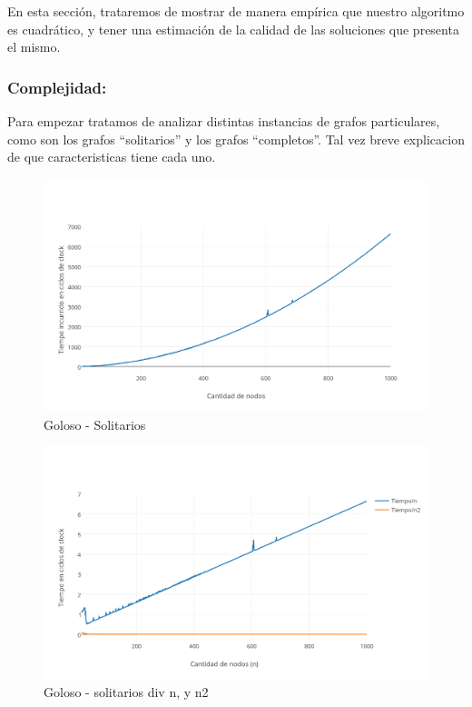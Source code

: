 En esta sección, trataremos de mostrar de manera empírica que nuestro algoritmo es cuadrático, y tener una estimación de la calidad de las soluciones que presenta el mismo.

\vspace*{0.6cm}

\subsubsection{Complejidad:}
\vspace*{0.3cm}

Para empezar tratamos de analizar distintas instancias de grafos particulares, como son los grafos ``solitarios'' y los grafos ``completos''. Tal vez breve explicacion de que caracteristicas tiene cada uno.

\begin{figure}[htb]
	\begin{center}
    		\includegraphics[scale=0.6]{imagenes/goloso-solitarios.png}
	\end{center}
	\caption{Goloso - Solitarios\label{fig:2A}}
\end{figure}

\begin{figure}[htb]
	\begin{center}
    		\includegraphics[scale=0.6]{imagenes/goloso-solitarios-div.png}
	\end{center}
	\caption{Goloso - solitarios div n, y n2\label{fig:2B}}
\end{figure}

